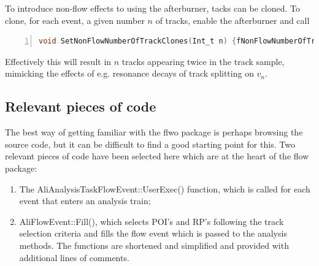 \documentclass[a4paper]{book}
\numberwithin{equation}{subsection}
\begin{document}
To introduce non-flow effects to using the afterburner, tacks can be cloned. To clone, for each event, a given number $n$ of tracks, enable the afterburner and call
\begin{lstlisting}[language=C, numbers=left]
  void SetNonFlowNumberOfTrackClones(Int_t n) {fNonFlowNumberOfTrackClones=n;}\end{lstlisting}
Effectively this will result in $n$ tracks appearing twice in the track sample, mimicking the effects of e.g. resonance decays of track splitting on $v_n$.

\subsection{Relevant pieces of code}
The best way of getting familiar with the flwo package is perhaps browsing the source code, but it can be difficult to find a good starting point for this. Two relevant pieces of code have been selected here which are at the heart of the flow package: 
\begin{enumerate}
\item The AliAnalysisTaskFlowEvent::UserExec() function, which is called for each event that enters an analysis train;
\item AliFlowEvent::Fill(), which selects POI's and RP's following the track selection criteria and fills the flow event which is passed to the analysis methods. The functions are shortened and simplified and provided with additional lines of comments.
\end{enumerate}
\end{document}
